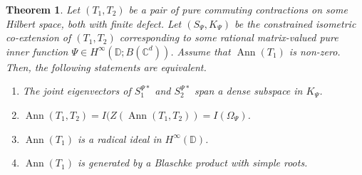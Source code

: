 \documentclass[10pt]{amsart}
\newcommand{\bC}{{\mathbb{C}}}
\newcommand{\bD}{{\mathbb{D}}}
\newcommand{\Ann}{\operatorname{Ann}}
\newtheorem{theorem}[lemma]{Theorem}
\theoremstyle{definition}
\begin{document}
\begin{theorem}\label{T:specsynth}
Let $(T_1,T_2)$ be a pair of pure commuting contractions on some Hilbert space, both with finite defect. Let $(S_\Psi,K_\Psi)$ be the constrained isometric co-extension of $(T_1,T_2)$ corresponding to some rational matrix-valued pure inner function $\Psi\in H^\infty(\bD;B(\bC^d))$. Assume that $\Ann(T_1)$ is non-zero. Then, the following statements are equivalent.
\begin{enumerate}[{\rm (i)}]
\item The joint eigenvectors of $S_1^{\Psi *}$ and $S_2^{\Psi *}$ span a dense subspace in $K_\Psi$.
\item $\Ann(T_1,T_2)=I(Z(\Ann(T_1,T_2))=I(\Omega_\Psi)$.
\item $\Ann(T_1)$ is a radical ideal in $H^\infty(\bD)$.
\item $\Ann(T_1)$ is generated by a Blaschke product with simple roots.
\end{enumerate}
\end{theorem}
\end{document}
